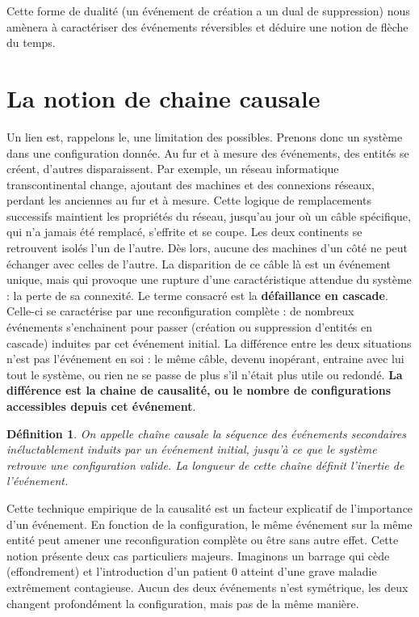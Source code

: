 \documentclass{report}
\newtheorem{definition}{Définition}[section]
\begin{document}
		Cette forme de dualité (un événement de création a un dual de suppression) nous amènera à caractériser des événements réversibles et déduire une notion de flèche du temps. 
		
	\section{La notion de chaine causale}
	
	
		Un lien est, rappelons le, une limitation des possibles. Prenons donc un système dans une configuration donnée. Au fur et à mesure des événements, des entités se créent, d'autres disparaissent. Par exemple, un réseau informatique transcontinental change, ajoutant des machines et des connexions réseaux, perdant les anciennes au fur et à mesure. Cette logique de remplacements successifs maintient les propriétés du réseau, jusqu'au jour où un câble spécifique, qui n'a jamais été remplacé, s'effrite et se coupe. Les deux continents se retrouvent isolés l'un de l'autre. Dès lors, aucune des machines d'un côté ne peut échanger avec celles de l'autre. La disparition de ce câble là est un événement unique, mais qui provoque une rupture d'une caractéristique attendue du système : la perte de sa connexité. Le terme consacré est la \textbf{défaillance en cascade}. Celle-ci se caractérise par une reconfiguration complète : de nombreux événements s'enchainent pour passer (création ou suppression d'entités en cascade) induites par cet événement initial. La différence entre les deux situations n'est pas l'événement en soi : le même câble, devenu inopérant, entraine avec lui tout le système, ou rien ne se passe de plus s'il n'était plus utile ou redondé. \textbf{La différence est la chaine de causalité, ou le nombre de configurations accessibles depuis cet événement}. 
		
		
		\begin{definition}
			On appelle chaîne causale la séquence des événements secondaires inéluctablement induits par un événement initial, jusqu'à ce que le système retrouve une configuration valide. La longueur de cette chaîne définit l'inertie de l'événement. 
		\end{definition}
		
		Cette technique empirique de la causalité est un facteur explicatif de l'importance d'un événement. En fonction de la configuration, le même événement sur la même entité peut amener une reconfiguration complète ou être sans autre effet. Cette notion présente deux cas particuliers majeurs. Imaginons un barrage qui cède (effondrement) et l'introduction d'un patient $0$ atteint d'une grave maladie extrêmement contagieuse. Aucun des deux événements n'est symétrique, les deux changent profondément la configuration, mais pas de la même manière. 
		
\end{document}
